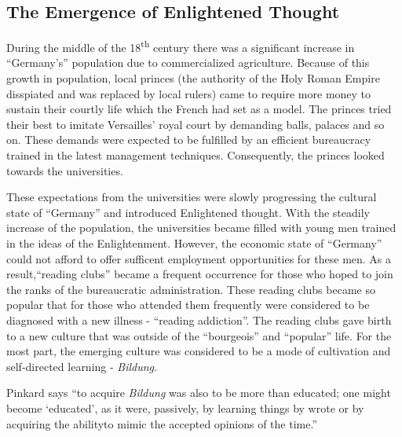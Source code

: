 \documentclass{article}
\begin{document}
  \subsection{The Emergence of Enlightened Thought}

During the middle of the 18\textsuperscript{th} century there was a significant increase in ``Germany's'' population due to commercialized agriculture. 
Because of this growth in population, local princes (the authority of the Holy Roman Empire disspiated and was replaced by local rulers) came to require more money to sustain their courtly life which the French had set as a model. 
The princes tried their best to imitate Versailles' royal court by demanding balls, palaces and so on. These demands were expected to be fulfilled by an efficient bureaucracy trained in the latest management techniques.
Consequently, the princes looked towards the universities. 

These expectations from the universities were slowly progressing the cultural state of ``Germany'' and introduced Enlightened thought. With the steadily increase of the population, the universities became filled with young men 
trained in the ideas of the Enlightenment. However, the economic state of ``Germany'' could not afford to offer sufficent employment opportunities for these men. As a result,``reading clubs'' became a frequent occurrence for those who hoped to join the ranks of
the bureaucratic administration. These reading clubs became so popular that for those who attended them frequently were considered to be diagnosed with a new illness - ``reading addiction''.
The reading clubs gave birth to a new culture that was outside of the ``bourgeois'' and ``popular'' life. For the most part, the emerging culture was considered to be a mode of cultivation and self-directed learning - \textit{Bildung}.

Pinkard says ``to acquire \textit{Bildung} was also to be more than educated; one might become `educated', as it were, passively, by learning things by wrote or by acquiring the abilityto mimic the accepted  opinions of the time.''
\end{document}
